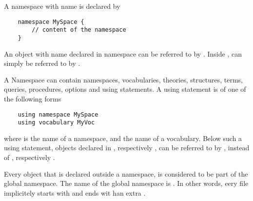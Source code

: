 
A namespace with name  is declared by
\begin{lstlisting}
	namespace MySpace {
		// content of the namespace
	}
\end{lstlisting}

An object with name  declared in namespace  can be referred to by .  Inside ,  can simply be referred to by .

A Namespace can contain namespaces, vocabularies, theories, structures, terms, queries, procedures, options and using statements.  A using statement is of one of the following forms
\begin{lstlisting}
	using namespace MySpace
	using vocabulary MyVoc
\end{lstlisting}
where  is the name of a namespace, and  the name of a vocabulary.  Below such a using statement, objects  declared in , respectively , can be referred to by , instead of , respectively .

Every object that is declared outside a namespace, is considered to be part of the global namespace.  The name of the global namespace is .  In other words, eery \idp file implicitely starts with  and ends wit han extra \code{\}}.




